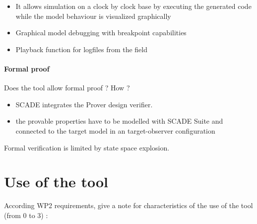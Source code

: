 \begin{itemize}
	\item It allows simulation on a clock by clock base by executing the generated code while the model behaviour is visualized graphically
	\item Graphical model debugging with breakpoint capabilities
	\item Playback function for logfiles from the field
\end{itemize}

\paragraph{Formal proof}
Does the tool allow formal proof ?  How ?

\begin{itemize}
	\item SCADE integrates the Prover design verifier. 
	\item the provable properties have to be modelled with SCADE Suite and connected to the target model in an target-observer configuration
\end{itemize}


\begin{assessor1}
  Formal verification is limited by state space explosion.
\end{assessor1}

\section{Use of the tool}


According WP2 requirements, give a note for characteristics of the use of the tool (from 0 to 3) :

